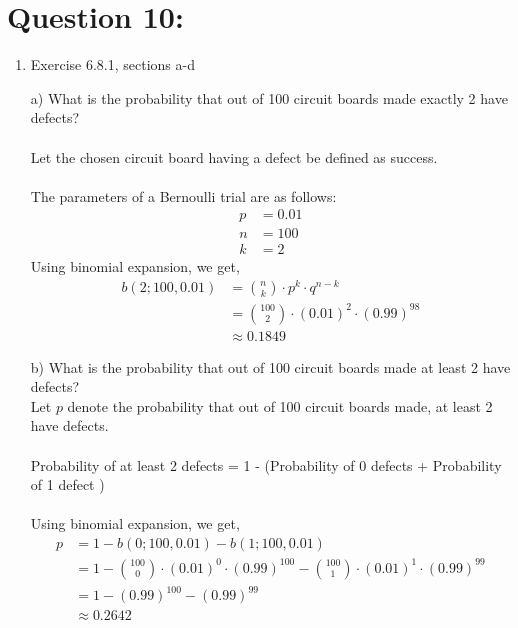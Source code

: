 \documentclass[14pt]{extreport}
\begin{document}
\section*{Question 10:}
\begin{enumerate}[label=(\alph*)]

\item  Exercise	6.8.1, sections a-d
\newline

a) What is the probability that out of 100 circuit boards made exactly 2 have defects?\\\\
Let the chosen circuit board having a defect be defined as success.\\\\
The parameters of a Bernoulli trial are as follows:
\begin{align*}
    p &= 0.01\\
    n &= 100\\
    k &= 2
\end{align*}
Using binomial expansion, we get,
\begin{align*}
        b\left ( 2; 100, 0.01 \right )  &=  \binom{n}{k}\cdot p^{k}\cdot q^{n-k}\\
                &=  \binom{100}{2}\cdot (0.01)^{2}\cdot (0.99)^{98}\\
                &\approx 0.1849
\end{align*}

b) What is the probability that out of 100 circuit boards made at least 2 have defects?\\

Let $p$ denote the probability that out of 100 circuit boards made, at least 2 have defects.\\\\
Probability of at least 2 defects = 1 - (Probability of 0 defects + Probability of 1 defect )\\\\
Using binomial expansion, we get,
\begin{align*}
        p  &=  1 - b\left ( 0; 100, 0.01 \right ) - b\left ( 1; 100, 0.01 \right )\\
                &= 1 - \binom{100}{0}\cdot (0.01)^{0}\cdot (0.99)^{100} - \binom{100}{1}\cdot (0.01)^{1}\cdot (0.99)^{99}\\
                &= 1-(0.99)^{100} - (0.99)^{99}\\
                &\approx 0.2642
\end{align*}
\newpage


\end{enumerate}
\end{document}

